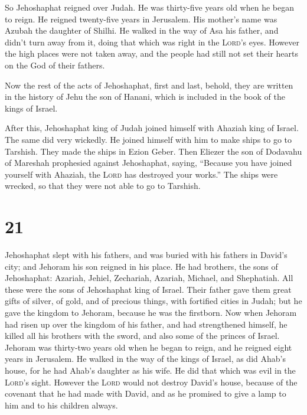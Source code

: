  So Jehoshaphat reigned over Judah. He was thirty-five
years old when he began to reign. He reigned twenty-five years in
Jerusalem. His mother's name was Azubah the daughter of Shilhi.
 He walked in the way of Asa his father, and didn't turn
away from it, doing that which was right in the \textsc{Lord}'s eyes.
 However the high places were not taken away, and the
people had still not set their hearts on the God of their fathers.

 Now the rest of the acts of Jehoshaphat, first and last,
behold, they are written in the history of Jehu the son of Hanani, which
is included in the book of the kings of Israel.

 After this, Jehoshaphat king of Judah joined himself
with Ahaziah king of Israel. The same did very wickedly. 
He joined himself with him to make ships to go to Tarshish. They made
the ships in Ezion Geber.  Then Eliezer the son of
Dodavahu of Mareshah prophesied against Jehoshaphat, saying, ``Because
you have joined yourself with Ahaziah, the \textsc{Lord} has destroyed
your works.'' The ships were wrecked, so that they were not able to go
to Tarshish.

\hypertarget{section-20}{%
\section{21}\label{section-20}}

 Jehoshaphat slept with his fathers, and was buried with
his fathers in David's city; and Jehoram his son reigned in his place.
 He had brothers, the sons of Jehoshaphat: Azariah,
Jehiel, Zechariah, Azariah, Michael, and Shephatiah. All these were the
sons of Jehoshaphat king of Israel.  Their father gave
them great gifts of silver, of gold, and of precious things, with
fortified cities in Judah; but he gave the kingdom to Jehoram, because
he was the firstborn.  Now when Jehoram had risen up over
the kingdom of his father, and had strengthened himself, he killed all
his brothers with the sword, and also some of the princes of Israel.
 Jehoram was thirty-two years old when he began to reign,
and he reigned eight years in Jerusalem.  He walked in the
way of the kings of Israel, as did Ahab's house, for he had Ahab's
daughter as his wife. He did that which was evil in the \textsc{Lord}'s
sight.  However the \textsc{Lord} would not destroy
David's house, because of the covenant that he had made with David, and
as he promised to give a lamp to him and to his children always.


